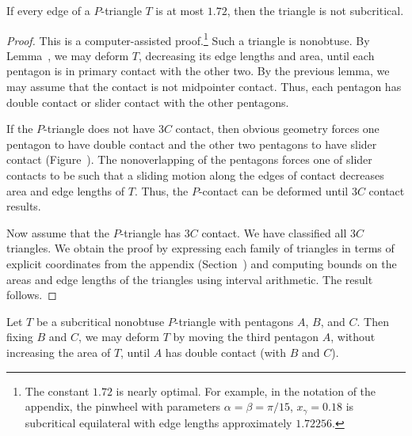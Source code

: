\begin{lemma}
  If every edge of a $P$-triangle $T$ is at most $1.72$, then the
  triangle is not subcritical.
\end{lemma}

\begin{proof} This is a computer-assisted proof.\footnote{The constant
    $1.72$ is nearly optimal.  For example, in the notation of the
    appendix, the pinwheel with parameters $\alpha=\beta=\pi/15$,
    $x_\gamma = 0.18$ is subcritical equilateral with edge lengths
    approximately $1.72256$.} Such a triangle is nonobtuse.  By
  Lemma~, we may deform $T$, decreasing its
  edge lengths and area, until each pentagon is in primary contact
  with the other two.  By the previous lemma, we may assume that the
  contact is not midpointer contact.  Thus, each pentagon has double
  contact or slider contact with the other pentagons.

  If the $P$-triangle does not have $3C$ contact, then obvious
  geometry forces one pentagon to have double contact and the other
  two pentagons to have slider contact (Figure~).
  The nonoverlapping of the pentagons forces one of slider contacts to
  be such that a sliding motion along the edges of contact decreases
  area and edge lengths of $T$.  Thus, the $P$-contact can be deformed
  until $3C$ contact results.



Now assume that the $P$-triangle has $3C$ contact.
We have classified all $3C$ triangles.  We obtain the proof
by expressing each family of triangles in terms of explicit
coordinates from the appendix (Section~) and
computing bounds on the areas and edge lengths of the triangles using
interval arithmetic.  The result follows.
\end{proof}

\begin{lemma} 
  Let $T$ be a subcritical nonobtuse $P$-triangle with pentagons $A$,
  $B$, and $C$.  Then fixing $B$ and $C$, we may deform $T$ by moving
  the third pentagon $A$, without increasing the area of $T$, until
  $A$ has double contact (with $B$ and $C$).
\end{lemma}

